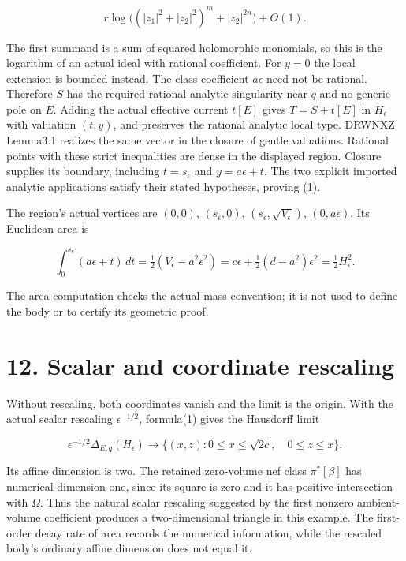 \documentclass[11pt]{article}
\begin{document}
\[r\log\big((|z_1|^2+|z_2|^2)^m+|z_2|^{2n}\big)+O(1).\]

The first summand is a sum of squared holomorphic monomials, so this is the logarithm of an actual ideal with rational coefficient. For $y=0$ the local extension is bounded instead. The class coefficient $a\epsilon$ need not be rational. Therefore $S$ has the required rational analytic singularity near $q$ and no generic pole on $E$. Adding the actual effective current $t[E]$ gives $T=S+t[E]$ in $H_\epsilon$ with valuation $(t,y)$, and preserves the rational analytic local type. DRWNXZ Lemma3.1 realizes the same vector in the closure of gentle valuations. Rational points with these strict inequalities are dense in the displayed region. Closure supplies its boundary, including $t=s_\epsilon$ and $y=a\epsilon+t$. The two explicit imported analytic applications satisfy their stated hypotheses, proving (1).

The region's actual vertices are $(0,0)$, $(s_\epsilon,0)$, $(s_\epsilon,\sqrt{V_\epsilon})$, $(0,a\epsilon)$. Its Euclidean area is

\[\int_0^{s_\epsilon}(a\epsilon+t)\,dt
=\tfrac12(V_\epsilon-a^2\epsilon^2)
=c\epsilon+\tfrac12(d-a^2)\epsilon^2
=\tfrac12 H_\epsilon^2.\]

The area computation checks the actual mass convention; it is not used to define the body or to certify its geometric proof.

\section*{12. Scalar and coordinate rescaling}

Without rescaling, both coordinates vanish and the limit is the origin. With the actual scalar rescaling $\epsilon^{-1/2}$, formula(1) gives the Hausdorff limit

\[\epsilon^{-1/2}\Delta_{E,q}(H_\epsilon)
\longrightarrow \{(x,z):0\leq x\leq\sqrt{2c},\quad0\leq z\leq x\}.
\tag{2}\]

Its affine dimension is two. The retained zero-\allowbreak{}volume nef class $\pi^*[\beta]$ has numerical dimension one, since its square is zero and it has positive intersection with $\Omega$. Thus the natural scalar rescaling suggested by the first nonzero ambient-\allowbreak{}volume coefficient produces a two-\allowbreak{}dimensional triangle in this example. The first-\allowbreak{}order decay rate of area records the numerical information, while the rescaled body's ordinary affine dimension does not equal it.
\end{document}
